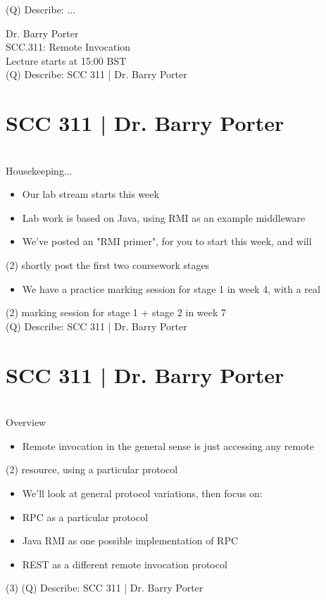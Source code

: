 \documentclass[12pt]{article}
\begin{document}
(Q)
Describe: ...
\clearpage

Dr. Barry Porter\\
SCC.311: Remote Invocation\\
Lecture starts at 15:00 BST\\
\clearpage
(Q)
Describe: SCC 311 | Dr. Barry Porter
\clearpage
\section{SCC 311 | Dr. Barry Porter}
\\
Housekeeping...\\
\begin{itemize}
  \item Our lab stream starts this week
  \item Lab work is based on Java, using RMI as an example middleware
  \item We've posted an "RMI primer", for you to start this week, and will 
\end{itemize}(2)
shortly post the first two coursework stages\\
\begin{itemize}
  \item We have a practice marking session for stage 1 in week 4, with a real 
\end{itemize}(2)
marking session for stage 1 + stage 2 in week 7\\
\clearpage
(Q)
Describe: SCC 311 | Dr. Barry Porter
\clearpage
\section{SCC 311 | Dr. Barry Porter}
\\
Overview\\
\begin{itemize}
  \item Remote invocation in the general sense is just accessing any remote 
\end{itemize}(2)
resource, using a particular protocol\\
\begin{itemize}
  \item We'll look at general protocol variations, then focus on:
  \item RPC as a particular protocol
  \item Java RMI as one possible implementation of RPC
  \item REST as a different remote invocation protocol
\end{itemize}(3)
\clearpage
(Q)
Describe: SCC 311 | Dr. Barry Porter
\clearpage
\end{document}
